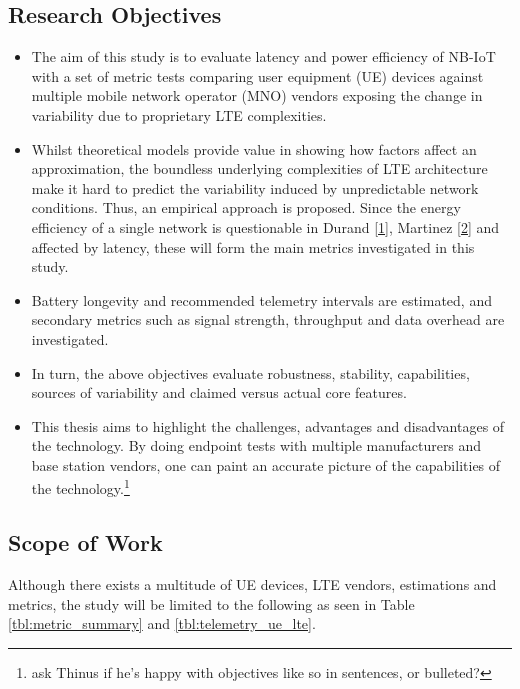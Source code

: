 \documentclass[]{article}
\begin{document}
\hypertarget{resobj}{%
\subsection{Research Objectives}\label{resobj}}

\begin{itemize}
\item
  The aim of this study is to evaluate latency and power efficiency of
  NB-IoT with a set of metric tests comparing user equipment (UE)
  devices against multiple mobile network operator (MNO) vendors
  exposing the change in variability due to proprietary LTE
  complexities.
\item
  Whilst theoretical models provide value in showing how factors affect
  an approximation, the boundless underlying complexities of LTE
  architecture make it hard to predict the variability induced by
  unpredictable network conditions. Thus, an empirical approach is
  proposed. Since the energy efficiency of a single network is
  questionable in Durand {[}\protect\hyperlink{ref-Durand2019}{1}{]},
  Martinez {[}\protect\hyperlink{ref-Martinez2019}{2}{]} and affected by
  latency, these will form the main metrics investigated in this study.
\item
  Battery longevity and recommended telemetry intervals are estimated,
  and secondary metrics such as signal strength, throughput and data
  overhead are investigated.
\item
  In turn, the above objectives evaluate robustness, stability,
  capabilities, sources of variability and claimed versus actual core
  features.
\item
  This thesis aims to highlight the challenges, advantages and
  disadvantages of the technology. By doing endpoint tests with multiple
  manufacturers and base station vendors, one can paint an accurate
  picture of the capabilities of the technology.\footnote{ask Thinus if
    he's happy with objectives like so in sentences, or bulleted?}
\end{itemize}

\hypertarget{scopework}{%
\subsection{Scope of Work}\label{scopework}}

Although there exists a multitude of UE devices, LTE vendors,
estimations and metrics, the study will be limited to the following as
seen in Table \ref{tbl:metric_summary} and \ref{tbl:telemetry_ue_lte}.
\end{document}
